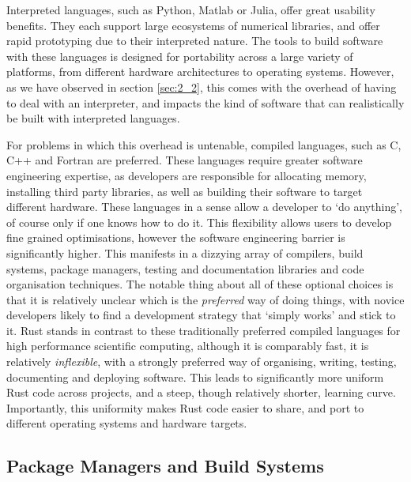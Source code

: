 Interpreted languages, such as Python, Matlab or Julia, offer great usability benefits. They each support large ecosystems of numerical libraries, and offer rapid prototyping due to their interpreted nature. The tools to build software with these languages is designed for portability across a large variety of platforms, from different hardware architectures to operating systems. However, as we have observed in section \ref{sec:2_2}, this comes with the overhead of having to deal with an interpreter, and impacts the kind of software that can realistically be built with interpreted languages.

For problems in which this overhead is untenable, compiled languages, such as C, C++ and Fortran are preferred. These languages require greater software engineering expertise, as developers are responsible for allocating memory, installing third party libraries, as well as building their software to target different hardware. These languages in a sense allow a developer to `do anything', of course only if one knows how to do it. This flexibility allows users to develop fine grained optimisations, however the software engineering barrier is significantly higher. This manifests in a dizzying array of compilers, build systems, package managers, testing and documentation libraries and code organisation techniques. The notable thing about all of these optional choices is that it is relatively unclear which is the \textit{preferred} way of doing things, with novice developers likely to find a development strategy that `simply works' and stick to it. Rust stands in contrast to these traditionally preferred compiled languages for high performance scientific computing, although it is comparably fast, it is relatively \textit{inflexible}, with a strongly preferred way of organising, writing, testing, documenting and deploying software. This leads to significantly more uniform Rust code across projects, and a steep, though relatively shorter, learning curve. Importantly, this uniformity makes Rust code easier to share, and port to different operating systems and hardware targets.

\subsection*{Package Managers and Build Systems}

